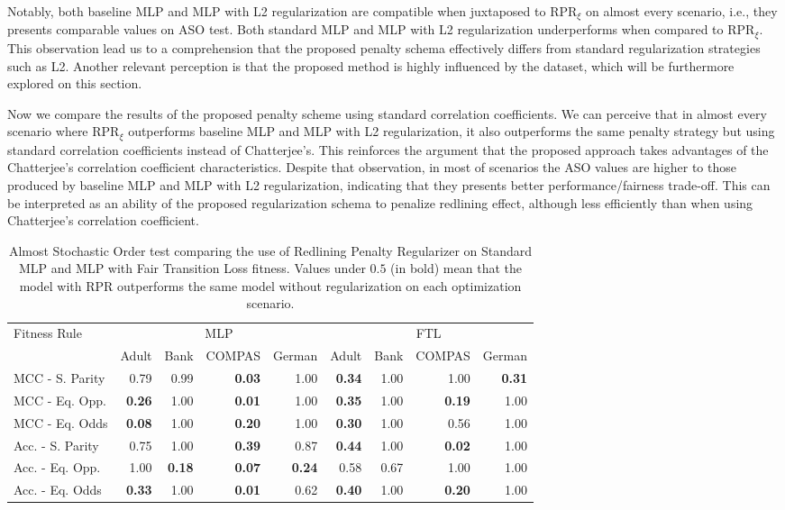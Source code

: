 Notably, both baseline MLP and MLP with L2 regularization are compatible when juxtaposed to RPR$_{\xi}$ on almost every scenario, i.e., they presents comparable values on ASO test. Both standard MLP and MLP with L2 regularization underperforms when compared to RPR$_{\xi}$. This observation lead us to a comprehension that the proposed penalty schema effectively differs from standard regularization strategies such as L2. Another relevant perception is that the proposed method is highly influenced by the dataset, which will be furthermore explored on this section.

Now we compare the results of the proposed penalty scheme using standard correlation coefficients. We can perceive that in almost every scenario where RPR$_{\xi}$ outperforms baseline MLP and MLP with L2 regularization, it also outperforms the same penalty strategy but using standard correlation coefficients instead of Chatterjee's. This reinforces the argument that the proposed approach takes advantages of the Chatterjee's correlation coefficient characteristics. Despite that observation, in most of scenarios the ASO values are higher to those produced by baseline MLP and MLP with L2 regularization, indicating that they presents better performance/fairness trade-off. This can be interpreted as an ability of the proposed regularization schema to penalize redlining effect, although less efficiently than when using Chatterjee's correlation coefficient.

\begin{table}[ht]
\centering
\caption{Almost Stochastic Order test comparing the use of Redlining Penalty Regularizer on Standard MLP and MLP with Fair Transition Loss fitness. Values under $0.5$ (in bold) mean that the model with RPR outperforms the same model without regularization on each optimization scenario.} \label{tab:aso_compare_rpr}
{\footnotesize
\begin{tabular}{lrrrr|rrrr}
\toprule
\multirow{2}{*}{Fitness Rule} & \multicolumn{4}{c}{MLP} & \multicolumn{4}{c}{FTL} \\
& Adult & Bank & COMPAS & German & Adult & Bank & COMPAS & German \\
\midrule
MCC - S. Parity & 0.79 & 0.99 & \textbf{0.03} & 1.00 & \textbf{0.34} & 1.00 & 1.00 & \textbf{0.31} \\
MCC - Eq. Opp. & \textbf{0.26} & 1.00 & \textbf{0.01} & 1.00 & \textbf{0.35} & 1.00 & \textbf{0.19} & 1.00 \\
MCC - Eq. Odds & \textbf{0.08} & 1.00 & \textbf{0.20} & 1.00 & \textbf{0.30} & 1.00 & 0.56 & 1.00 \\
Acc. - S. Parity & 0.75 & 1.00 & \textbf{0.39} & 0.87 & \textbf{0.44} & 1.00 & \textbf{0.02} & 1.00 \\
Acc. - Eq. Opp. & 1.00 & \textbf{0.18} & \textbf{0.07} & \textbf{0.24} & 0.58 & 0.67 & 1.00 & 1.00 \\
Acc. - Eq. Odds & \textbf{0.33} & 1.00 & \textbf{0.01} & 0.62 & \textbf{0.40} & 1.00 & \textbf{0.20} & 1.00 \\
\bottomrule
\end{tabular}
}
\end{table}


